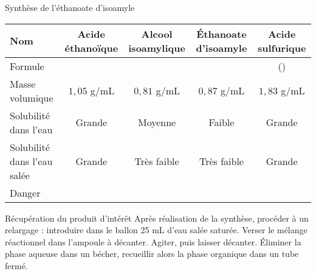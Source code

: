 \begin{doc}{Synthèse de l'éthanoate d'isoamyle}
  \begin{tabularx}{\textwidth}{| X | C{0.15} | C{0.15} | C{0.15} | C{0.15} |}
    \hline
    Nom & Acide éthanoïque & Alcool isoamylique & Éthanoate d'isoamyle & Acide sulfurique
    \\ \hline
    Formule &  &  &  & ()
    \\ \hline
    Masse volumique & $1,\!05$ g/mL & $0,\!81$ g/mL & $0,\!87$ g/mL & $1,\!83$ g/mL
    \\ \hline
    Solubilité dans l'eau & Grande & Moyenne & Faible & Grande
    \\ \hline
    Solubilité dans l'eau salée & Grande & Très faible & Très faible & Grande
    \\ \hline
    Danger &
    ~ & 
    ~ &
     &
    \\ \hline
  \end{tabularx}
\end{doc}


\begin{doc}{Récupération du produit d'intérêt}
  Après réalisation de la synthèse, procéder à un relargage : introduire dans le ballon 25 mL d'eau salée saturée.
  Verser le mélange réactionnel dans l'ampoule à décanter.
  Agiter, puis laisser décanter.
  Éliminer la phase aqueuse dans un bécher, recueillir alors la phase organique dans un tube fermé.
\end{doc}


